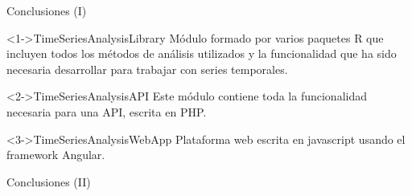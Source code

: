 \begin{tframe}{Conclusiones (I)}
	\begin{block}<1->{TimeSeriesAnalysisLibrary}
		Módulo formado por varios paquetes R que incluyen todos los métodos de análisis utilizados y la funcionalidad que ha sido necesaria desarrollar para trabajar con series temporales.
	\end{block}
	\begin{block}<2->{TimeSeriesAnalysisAPI}
		Este módulo contiene toda la funcionalidad necesaria para una API, escrita en PHP.
	\end{block}
	\begin{block}<3->{TimeSeriesAnalysisWebApp}
		Plataforma web escrita en javascript usando el framework Angular.
	\end{block}
\end{tframe}

\begin{tframe}{Conclusiones (II)}
	\begin{center}
	\end{center}
\end{tframe}